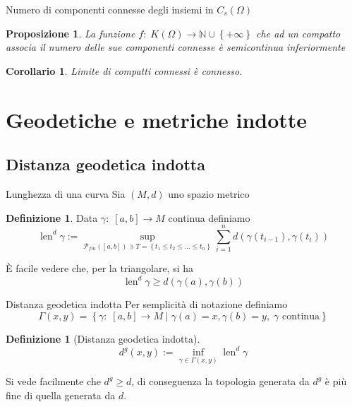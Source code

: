 \documentclass{beamer}
\newcounter{counter1}
\theoremstyle{plain}
\newtheorem{mypro}[counter1]{Proposizione}
\newtheorem{mycor}[counter1]{Corollario}
\theoremstyle{definition}
\newtheorem{mydef}[counter1]{Definizione}
\theoremstyle{remark}
\newcommand{\set}[1]{\left\{#1\right\}}
\newcommand{\pa}[1]{\left(#1\right)}
\newcommand{\bra}[1]{\left[#1\right]}
\DeclareMathOperator{\len}{len}
\begin{document}
\begin{frame}{Numero di componenti connesse degli insiemi in
    $C_s(\Omega)$}
  \begin{mypro}
    La funzione $f:\; K(\Omega) \rightarrow \mathbb{N} \cup \set{+\infty}$
    che ad un compatto associa il numero delle sue componenti connesse è
    semicontinua inferiormente
  \end{mypro}
  \begin{mycor}
    Limite di compatti connessi è connesso.
  \end{mycor}
\end{frame}

\section{Geodetiche e metriche indotte}

\subsection{Distanza geodetica indotta}

\begin{frame}{Lunghezza di una curva}
  Sia $(M,d)$ uno spazio metrico
  \begin{mydef}
    Data $\gamma : \; \bra{a,b} \to M$ continua definiamo
    \[ \len^d \gamma := \sup _{\mathcal{P}_{fin}(\bra{a,b}) \ni T =
      \set{t_1 \le t_2 \le ... \le t_n}} \sum_{i=1}^n d\pa{
      \gamma\pa{t_{i-1}}, \gamma\pa{t_i}} \]
  \end{mydef}
  È facile vedere che, per la triangolare, si ha
  \[ \len^d \gamma \ge d\pa{\gamma\pa{a}, \gamma\pa{b}} \]

\end{frame}

\begin{frame}{Distanza geodetica indotta}
  Per semplicità di notazione definiamo
  \[ \Gamma (x,y) = \set{\gamma:\; \bra{a,b} \to M \mid
    \gamma(a) = x, \gamma(b) = y,\; \gamma \text{ continua}} \]
  
  \begin{mydef}[Distanza geodetica indotta]
    \[ d^g (x,y) := \inf _{\gamma \in \Gamma(x,y)} \len^d \gamma \]
  \end{mydef}

  Si vede facilmente che $d^g \ge d$, di conseguenza la topologia
  generata da $d^g$ è più fine di quella generata da $d$.
\end{frame}
\end{document}
